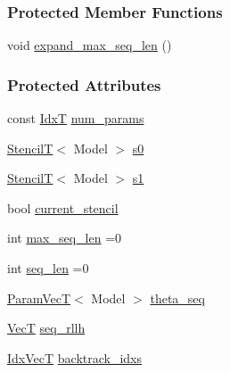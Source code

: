 \subsubsection*{Protected Member Functions}
\begin{DoxyCompactItemize}
\item 
void \hyperlink{classmappel_1_1estimator_1_1IterativeMaximizer_1_1MaximizerData_a7cf4afd2d88c88d0f3b192374ce8d9ea}{expand\+\_\+max\+\_\+seq\+\_\+len} ()
\end{DoxyCompactItemize}
\subsubsection*{Protected Attributes}
\begin{DoxyCompactItemize}
\item 
const \hyperlink{namespacemappel_ab17ec0f30b61ece292439d7ece81d3a8}{IdxT} \hyperlink{classmappel_1_1estimator_1_1IterativeMaximizer_1_1MaximizerData_ab4a5825d98602d9f94f3666c2167619d}{num\+\_\+params}
\item 
\hyperlink{namespacemappel_a3a06598240007876f8c4bf834ad86197}{StencilT}$<$ Model $>$ \hyperlink{classmappel_1_1estimator_1_1IterativeMaximizer_1_1MaximizerData_a10660729fb16b8b8ab4f719562e5b87c}{s0}
\item 
\hyperlink{namespacemappel_a3a06598240007876f8c4bf834ad86197}{StencilT}$<$ Model $>$ \hyperlink{classmappel_1_1estimator_1_1IterativeMaximizer_1_1MaximizerData_afbda1c2de786b3784fb278c4fbd56c3f}{s1}
\item 
bool \hyperlink{classmappel_1_1estimator_1_1IterativeMaximizer_1_1MaximizerData_a0f5328ef64b11fd94af32cc664efc4e4}{current\+\_\+stencil}
\item 
int \hyperlink{classmappel_1_1estimator_1_1IterativeMaximizer_1_1MaximizerData_a02b371b8d27f7458223b7442d9f6b55c}{max\+\_\+seq\+\_\+len} =0
\item 
int \hyperlink{classmappel_1_1estimator_1_1IterativeMaximizer_1_1MaximizerData_a13c682174ed62ae2b55e4c22ca4ad57b}{seq\+\_\+len} =0
\item 
\hyperlink{namespacemappel_a0f86d3153e4e27b095012f140eea58de}{Param\+VecT}$<$ Model $>$ \hyperlink{classmappel_1_1estimator_1_1IterativeMaximizer_1_1MaximizerData_a7fd34d49221c35e0e5977b8349c543c5}{theta\+\_\+seq}
\item 
\hyperlink{namespacemappel_a2225ad69f358daa3f4f99282a35b9a3a}{VecT} \hyperlink{classmappel_1_1estimator_1_1IterativeMaximizer_1_1MaximizerData_ae51783c964589222eb1f88487ba843a1}{seq\+\_\+rllh}
\item 
\hyperlink{namespacemappel_ac63743dcd42180127307cd0e4ecdd784}{Idx\+VecT} \hyperlink{classmappel_1_1estimator_1_1IterativeMaximizer_1_1MaximizerData_aa2e5e2e70dab82632a02aedfdb11f3fd}{backtrack\+\_\+idxs}
\end{DoxyCompactItemize}

